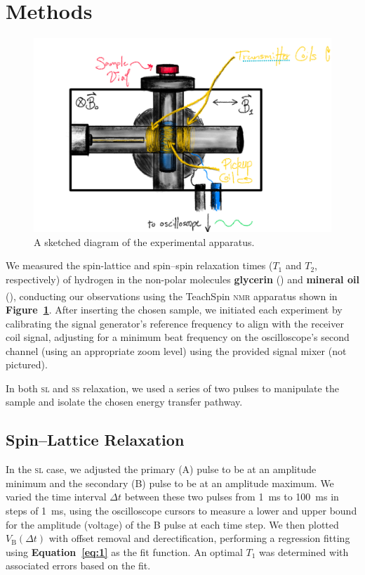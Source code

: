 \documentclass[12pt]{report}
\begin{document}
\section*{Methods}
{
    \begin{figure}[tbh]
        \centering
        \includegraphics[width=6in]{5-nmr/overleaf/images/diagram.jpg}
        \caption{A sketched diagram of the experimental apparatus.}
        \label{fig:experiment-diagram}
    \end{figure}
    
    We measured the spin-lattice and spin–spin relaxation times ($T_1$ and $T_2$, respectively) of hydrogen in the non-polar molecules \textbf{glycerin} () and \textbf{mineral oil} (), conducting our observations using the TeachSpin\textsuperscript{\tiny\textregistered} \textsc{nmr} apparatus shown in \textbf{Figure~\ref{fig:experiment-diagram}}. After inserting the chosen sample, we initiated each experiment by calibrating the signal generator’s reference frequency to align with the receiver coil signal, adjusting for a minimum beat frequency on the oscilloscope’s second channel (using an appropriate zoom level) using the provided signal mixer (not pictured).

    In both \textsc{sl} and \textsc{ss} relaxation, we used a series of two pulses to manipulate the sample and isolate the chosen energy transfer pathway.
    \subsection*{Spin–Lattice Relaxation}
    {
        In the \textsc{sl} case, we adjusted the primary (A) pulse to be at an amplitude minimum and the secondary (B) pulse to be at an amplitude maximum. We varied the time interval $\Delta t$ between these two pulses from \SI{1}{\milli\second} to \SI{100}{\milli\second} in steps of \SI{1}{\milli\second}, using the oscilloscope cursors to measure a lower and upper bound for the amplitude (voltage) of the B pulse at each time step. We then plotted $V_{\mathrm{B}}(\Delta t)$ with offset removal and derectification, performing a regression fitting using \textbf{Equation~\ref{eq:1}} as the fit function. An optimal $T_1$ was determined with associated errors based on the fit.
    }
}
\end{document}
